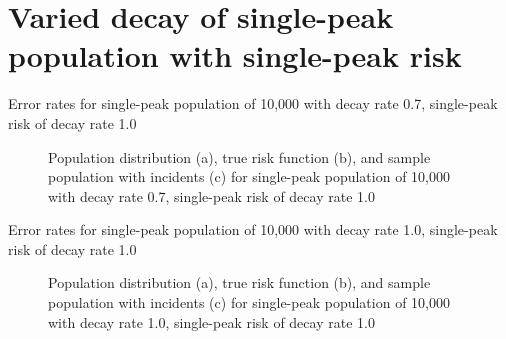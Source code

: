 \section{Varied decay of single-peak population with single-peak risk}
\label{sec:app:results_pX_100_1.0_1h}

\graphicspath{{./results/p0.7_100_1.0_1h/}}
\makeatletter
{}
\makeatother

\begin{table}[H]
    
    \caption[]{Error rates for single-peak population of 10,000 with decay rate 0.7, single-peak risk of decay rate 1.0}
    \label{tab:mean_error_rates:p0.7_100_1.0_1h}
\end{table}

\begin{figure}[H]
    
    \caption[]{Population distribution (a), true risk function (b), and sample population with incidents (c) for single-peak population of 10,000 with decay rate 0.7, single-peak risk of decay rate 1.0}
    \label{fig:distributions:p0.7_100_1.0_1h}    
\end{figure}

\graphicspath{{./results/p1.0_100_1.0_1h/}}
\makeatletter
{}
\makeatother

\begin{table}[H]
    
    \caption[]{Error rates for single-peak population of 10,000 with decay rate 1.0, single-peak risk of decay rate 1.0}
    \label{tab:mean_error_rates:p1.0_100_1.0_1h}
\end{table}

\begin{figure}[H]
    
    \caption[]{Population distribution (a), true risk function (b), and sample population with incidents (c) for single-peak population of 10,000 with decay rate 1.0, single-peak risk of decay rate 1.0}
    \label{fig:distributions:p1.0_100_1.0_1h}    
\end{figure}

\graphicspath{{./results/p1.4_100_1.0_1h/}}
\makeatletter
{}
\makeatother

